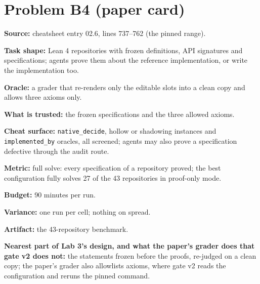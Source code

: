 \documentclass[11pt]{article}
\begin{document}
\section*{Problem B4 (paper card)}\label{ans:B4}
\begin{answer}
\textbf{Source:} cheatsheet entry 02.6, lines 737--762 (the pinned range).

\textbf{Task shape:} Lean 4 repositories with frozen definitions, API
signatures and specifications; agents prove them about the reference
implementation, or write the implementation too.

\textbf{Oracle:} a grader that re-renders only the editable slots into a
clean copy and allows three axioms only.

\textbf{What is trusted:} the frozen specifications and the three allowed
axioms.

\textbf{Cheat surface:} \texttt{native\_decide}, hollow or shadowing
instances and \texttt{implemented\_by} oracles, all screened; agents may
also prove a specification defective through the audit route.

\textbf{Metric:} full solve: every specification of a repository proved; the
best configuration fully solves 27 of the 43 repositories in proof-only
mode.

\textbf{Budget:} 90 minutes per run.

\textbf{Variance:} one run per cell; nothing on spread.

\textbf{Artifact:} the 43-repository benchmark.

\textbf{Nearest part of Lab 3's design, and what the paper's grader does that
gate v2 does not:} the statements frozen before the proofs, re-judged on a
clean copy; the paper's grader also allowlists axioms, where gate v2 reads
the configuration and reruns the pinned command.
\end{answer}

\end{document}
